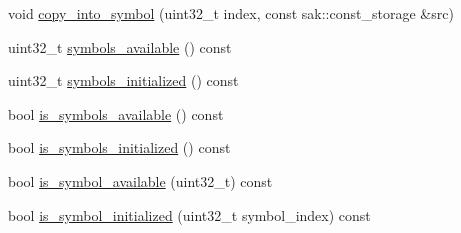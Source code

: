 \begin{DoxyCompactItemize}
void \hyperlink{classkodo_1_1deep__symbol__storage_a837d2a7ba38d38eec7cbee211a1edf0a}{copy\-\_\-into\-\_\-symbol} (uint32\-\_\-t index, const sak\-::const\-\_\-storage \&src)
\begin{DoxyCompactList}\small\item\em \end{DoxyCompactList}\item 
uint32\-\_\-t \hyperlink{classkodo_1_1deep__symbol__storage_a77eccdcb9b054c75d9759e55f9f3a8cb}{symbols\-\_\-available} () const 
\begin{DoxyCompactList}\small\item\em \end{DoxyCompactList}\item 
uint32\-\_\-t \hyperlink{classkodo_1_1deep__symbol__storage_a00b5faabc1bd907e1b6da45ad94fae13}{symbols\-\_\-initialized} () const 
\begin{DoxyCompactList}\small\item\em \end{DoxyCompactList}\item 
bool \hyperlink{classkodo_1_1deep__symbol__storage_a454610d6140bae3201a9afd988ec9a4d}{is\-\_\-symbols\-\_\-available} () const 
\begin{DoxyCompactList}\small\item\em \end{DoxyCompactList}\item 
bool \hyperlink{classkodo_1_1deep__symbol__storage_a7ee5ac10506699b5b13ae2cdbe8e933d}{is\-\_\-symbols\-\_\-initialized} () const 
\begin{DoxyCompactList}\small\item\em \end{DoxyCompactList}\item 
bool \hyperlink{classkodo_1_1deep__symbol__storage_a76ca1f8a9d73a3e94dd52f54772aa6e5}{is\-\_\-symbol\-\_\-available} (uint32\-\_\-t) const 
\begin{DoxyCompactList}\small\item\em \end{DoxyCompactList}\item 
bool \hyperlink{classkodo_1_1deep__symbol__storage_a4117f8f05ceb37e00d71e0c297e425f2}{is\-\_\-symbol\-\_\-initialized} (uint32\-\_\-t symbol\-\_\-index) const 
\begin{DoxyCompactList}\small\item\em \end{DoxyCompactList}\end{DoxyCompactItemize}


